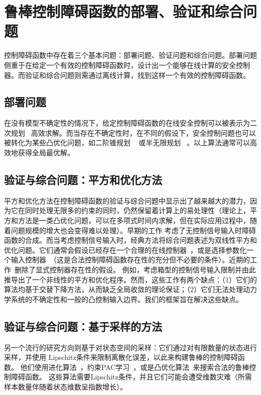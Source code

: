 
\chapter{鲁棒控制障碍函数的部署、验证和综合问题}
\label{sec:relatedwork}

控制障碍函数中存在着三个基本问题：部署问题、验证问题和综合问题。部署问题侧重于在给定一个有效的控制障碍函数时，设计出一个能够在线计算的安全控制器。而验证和综合问题则需通过离线计算，找到这样一个有效的控制障碍函数。

\section{部署问题} 
在没有模型不确定性的情况下，给定控制障碍函数的在线安全控制可以被表示为二次规划 ~\cite{ames2014cdc-cbforigin}高效求解。而当存在不确定性时，在不同的假设下，安全控制问题也可以被转化为某些凸优化问题，如二阶锥规划 ~\cite{long2022ral-robustsocp,dhiman2021tac-robustsocp} 或半无限规划~\cite{wei2022acc-uncertainsynthesis} 。以上算法通常可以高效地获得全局最优解。

\section{验证与综合问题：平方和优化方法}
平方和优化方法在控制障碍函数的验证与综合问题中显示出了越来越大的潜力，因为它在同时处理无限多的约束的同时，仍然保留着计算上的易处理性（理论上，平方和方法是一类凸优化问题，可以在多项式时间内求解，但在实际应用过程中，随着问题规模的增大也会变得难以处理）。早期的工作\cite{prajna2004hscc-bfsynthesis,prajna2006automatica-bfsynthesis} 考虑了无控制信号输入时障碍函数的合成。而当考虑控制信号输入时，经典方法将综合问题表述为双线性平方和优化问题。它们通常会假设已经存在一个合理的在线控制器~\cite{ames2019ecc-cbftheapp}，或是选择参数化一个输入控制器~\cite{wang2022arxiv-safetysynver}（这是合法控制障碍函数存在性的充分但不必要的条件）。近期的工作~\cite{clark22arxiv-cbf,dai2022arxiv-clfcbfsynveri,zhao22arxiv-cbfsos}删除了显式控制器存在性的假设。 例如，\cite{zhao22arxiv-cbfsos}考虑箱型的控制信号输入限制并由此推导出了一个非线性的平方和优化程序。然而，这些工作有两个缺点：（1）它们的算法均基于交替下降方法，从而缺乏全局收敛的理论保证；（2）它们无法处理动力学系统的不确定性和一般的凸控制输入边界。我们的框架旨在解决这些缺点。

\section{验证与综合问题：基于采样的方法}
另一个流行的研究方向则基于对状态空间的采样：它们通过对有限数量的状态进行采样，并使用 Lipschitz条件来限制离散化误差，以此来构建鲁棒的控制障碍函数。 他们使用进化算法~\cite{wei2022acc-uncertainsynthesis}，约束PAC学习~\cite{robey2021ifac-rcbfhybrid}，或是凸优化算法~\cite{lindemann2021arxiv-rcbfsafeexpert}来搜索合法的鲁棒控制障碍函数。 这些算法需要Lipschitz条件，并且它们可能会遭受维数灾难（所需样本数量伴随着状态维数呈指数增长）。

